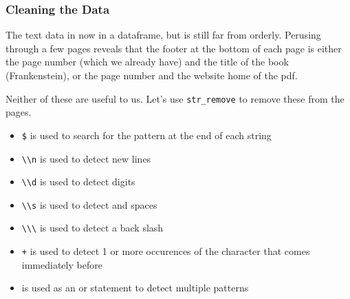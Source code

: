 \documentclass[]{article}
\newenvironment{Shaded}{\begin{snugshade}}{\end{snugshade}}
\newcommand{\CharTok}[1]{\textcolor[rgb]{0.31,0.60,0.02}{#1}}
\newcommand{\KeywordTok}[1]{\textcolor[rgb]{0.13,0.29,0.53}{\textbf{#1}}}
\newcommand{\NormalTok}[1]{#1}
\newcommand{\OperatorTok}[1]{\textcolor[rgb]{0.81,0.36,0.00}{\textbf{#1}}}
\newcommand{\StringTok}[1]{\textcolor[rgb]{0.31,0.60,0.02}{#1}}
\providecommand{\tightlist}{%
  \setlength{\itemsep}{0pt}\setlength{\parskip}{0pt}}
\begin{document}
\hypertarget{cleaning-the-data}{%
\subsubsection{Cleaning the Data}\label{cleaning-the-data}}

The text data in now in a dataframe, but is still far from orderly.
Perusing through a few pages reveals that the footer at the bottom of
each page is either the page number (which we already have) and the
title of the book (Frankenstein), or the page number and the website
home of the pdf.

Neither of these are useful to us. Let's use \texttt{str\_remove} to
remove these from the pages.

\begin{Shaded}
\end{Shaded}

\begin{itemize}
\tightlist
\item
  \texttt{\$} is used to search for the pattern at the end of each
  string
\item
  \texttt{\textbackslash{}\textbackslash{}n} is used to detect new lines
\item
  \texttt{\textbackslash{}\textbackslash{}d} is used to detect digits
\item
  \texttt{\textbackslash{}\textbackslash{}s} is used to detect and
  spaces
\item
  \texttt{\textbackslash{}\textbackslash{}\textbackslash{}} is used to
  detect a back slash
\item
  \texttt{+} is used to detect 1 or more occurences of the character
  that comes immediately before
\item
  \texttt{\textbar{}} is used as an or statement to detect multiple
  patterns
\end{itemize}
\end{document}
